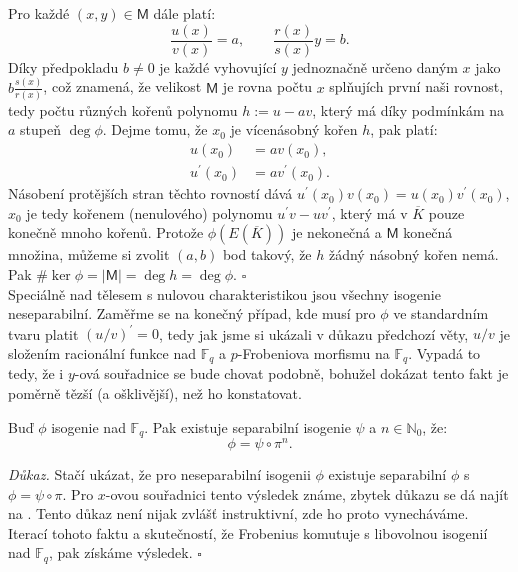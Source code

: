 \documentclass [12pt]{report}
\begin{document}
Pro každé $(x,y) \in \mathsf{M}$ dále platí:
\begin{equation*}
\frac{u(x)}{v(x)} = a, \qquad \frac{r(x)}{s(x)}y = b.
\end{equation*}
Díky předpokladu $b \neq 0$ je každé vyhovující $y$ jednoznačně určeno daným $x$ jako $b \frac{s(x)}{r(x)}$, což znamená, že velikost $\mathsf{M}$ je rovna počtu $x$ splňujích první naši rovnost, tedy počtu různých kořenů polynomu $h:= u - av$, který má díky podmínkám na $a$ stupeň $\deg \phi$. Dejme tomu, že $x_0$ je vícenásobný kořen $h$, pak platí:
\begin{align*}
u(x_0) &= a v(x_0),\\
u^{\prime} (x_0)  &=  a v^{\prime} (x_0).
\end{align*}  
Násobení protějších stran těchto rovností dává $u^{\prime} (x_0) v (x_0) = u (x_0) v^{\prime} (x_0)$, $x_0$ je tedy kořenem (nenulového) polynomu $u^\prime v - u v^\prime$, který má v $\overline{K}$ pouze konečně mnoho kořenů. Protože $\phi(E(\overline{K}))$ je nekonečná a $\mathsf{M}$ konečná množina, můžeme si zvolit $(a,b)$ bod takový, že $h$ žádný násobný kořen nemá. Pak $\# \ker \phi = \vert \mathsf{M}\vert = \deg h = \deg \phi$. \hfill $\square$\\


Speciálně nad tělesem s nulovou charakteristikou jsou všechny isogenie neseparabilní. Zaměřme se na konečný případ, kde musí pro $\phi$ ve standardním tvaru platit $(u/v)^\prime =0$, tedy jak jsme si ukázali v důkazu předchozí věty, $u/v$ je složením racionální funkce nad $\mathbb{F}_q$ a $p$-Frobeniova morfismu na $\mathbb{F}_q$. Vypadá to tedy, že i $y$-ová souřadnice se bude chovat podobně, bohužel dokázat tento fakt je poměrně tězší (a ošklivější), než ho konstatovat. 

\begin{dusledek}\label{separ2}
Buď $\phi$ isogenie nad $\mathbb{F}_q$. Pak existuje separabilní isogenie $\psi$ a $n \in \mathbb{N}_0$, že:
\begin{equation*}
\phi = \psi \circ \pi ^n.
\end{equation*}
\end{dusledek}

\noindent \textit{Důkaz.} Stačí ukázat, že pro neseparabilní isogenii $\phi$ existuje separabilní $\phi$ s $\phi = \psi \circ \pi$. Pro $x$-ovou souřadnici tento výsledek známe, zbytek důkazu se dá najít na \cite[Lemma 6.3.]{Sutherland}. Tento důkaz není nijak zvlášť instruktivní, zde ho proto vynecháváme. Iterací tohoto faktu a skutečností, že Frobenius komutuje s libovolnou isogenií nad $\mathbb{F}_q$, pak získáme výsledek. \hfill $\square$\\
\end{document}
